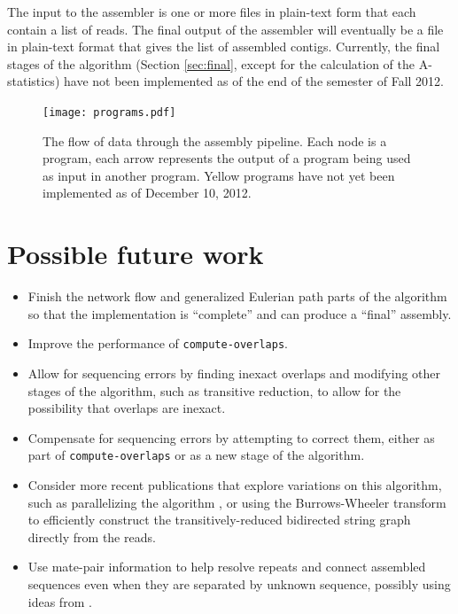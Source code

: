 \documentclass[12pt]{article}
\newcommand{\Section}[1]{Section \ref{#1}}
\newcommand{\ProgramName}[1]{{\tt #1}}
\begin{document}
The input to the assembler is one or more files in plain-text form that each
contain a list of reads.  The final output of the assembler will eventually be a
file in plain-text format that gives the list of assembled contigs.  Currently,
the final stages of the algorithm (\Section{sec:final}, except for the
calculation of the A-statistics) have not been implemented as of the end of the
semester of Fall 2012.

\begin{figure}
	\begin{center}
		\texttt{[image: programs.pdf]}
	\end{center}
	\caption{The flow of data through the assembly pipeline.  Each node is a
	program, each arrow represents the output of a program being used as input
	in another program.  Yellow programs have not yet been implemented as of
	December 10, 2012.}
	\label{fig:impl_graph}
\end{figure}

\section{Possible future work}

\begin{itemize}
\item Finish the network flow and generalized Eulerian path parts of the
algorithm so that the implementation is ``complete'' and can produce a ``final''
assembly.
\item Improve the performance of \ProgramName{compute-overlaps}.
\item Allow for sequencing errors by finding inexact overlaps and modifying other
stages of the algorithm, such as transitive reduction, to allow for the
possibility that overlaps are inexact.
\item Compensate for sequencing errors by attempting to correct them, either as
part of \ProgramName{compute-overlaps} or as a new stage of the algorithm.
\item Consider more recent publications that explore variations on this
algorithm, such as parallelizing the algorithm \cite{Jackson2008}, or using the
Burrows-Wheeler transform to efficiently construct the transitively-reduced
bidirected string graph directly from the reads\cite{Simpson2010}.
\item Use mate-pair information to help resolve repeats and connect assembled
sequences even when they are separated by unknown sequence, possibly using ideas
from \cite{Medvedev2009}.
\end{itemize}



\end{document}
